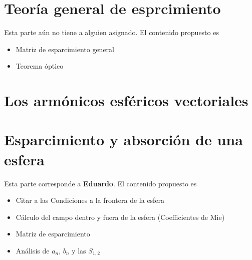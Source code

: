 \documentclass[12pts,a4paper]{book}
\begin{document}
\chapter{Teoría general de esprcimiento}
\label{ch:EsparcimientoGral} %

Esta parte aún no tiene a alguien asignado. El contenido propuesto es

\begin{itemize}
 \item Matriz de esparcimiento general
 \item Teorema óptico
\end{itemize}



\chapter{Los armónicos esféricos vectoriales}
\label{ch:AEV} 






\chapter{Esparcimiento y absorción de una esfera}
\label{ch:AEV} %
Esta parte corresponde a \textbf{Eduardo}. El contenido propuesto es

\begin{itemize}
 \item Citar a las Condiciones a la frontera de la esfera
 \item Cálculo del campo dentro y fuera de la esfera (Coefficientes de Mie)
 \item Matriz de esparcimiento
 \item Análisis de $a_n$, $b_n$ y las $S_{1,2}$
\end{itemize}
\end{document}
